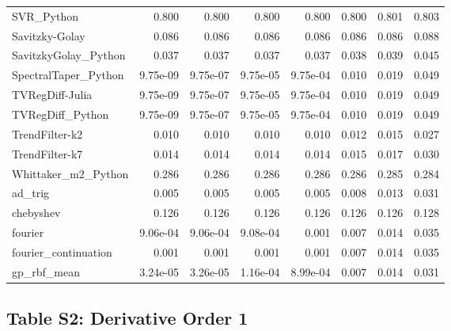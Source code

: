 \documentclass[10pt]{article}
\begin{document}
\begin{longtable}{lrrrrrrr}
SVR\_Python & 0.800 & 0.800 & 0.800 & 0.800 & 0.800 & 0.801 & 0.803 \\
Savitzky-Golay & 0.086 & 0.086 & 0.086 & 0.086 & 0.086 & 0.086 & 0.088 \\
SavitzkyGolay\_Python & 0.037 & 0.037 & 0.037 & 0.037 & 0.038 & 0.039 & 0.045 \\
SpectralTaper\_Python & 9.75e-09 & 9.75e-07 & 9.75e-05 & 9.75e-04 & 0.010 & 0.019 & 0.049 \\
TVRegDiff-Julia & 9.75e-09 & 9.75e-07 & 9.75e-05 & 9.75e-04 & 0.010 & 0.019 & 0.049 \\
TVRegDiff\_Python & 9.75e-09 & 9.75e-07 & 9.75e-05 & 9.75e-04 & 0.010 & 0.019 & 0.049 \\
TrendFilter-k2 & 0.010 & 0.010 & 0.010 & 0.010 & 0.012 & 0.015 & 0.027 \\
TrendFilter-k7 & 0.014 & 0.014 & 0.014 & 0.014 & 0.015 & 0.017 & 0.030 \\
Whittaker\_m2\_Python & 0.286 & 0.286 & 0.286 & 0.286 & 0.286 & 0.285 & 0.284 \\
ad\_trig & 0.005 & 0.005 & 0.005 & 0.005 & 0.008 & 0.013 & 0.031 \\
chebyshev & 0.126 & 0.126 & 0.126 & 0.126 & 0.126 & 0.126 & 0.128 \\
fourier & 9.06e-04 & 9.06e-04 & 9.08e-04 & 0.001 & 0.007 & 0.014 & 0.035 \\
fourier\_continuation & 0.001 & 0.001 & 0.001 & 0.001 & 0.007 & 0.014 & 0.035 \\
gp\_rbf\_mean & 3.24e-05 & 3.26e-05 & 1.16e-04 & 8.99e-04 & 0.007 & 0.014 & 0.031 \\
\bottomrule
\end{longtable}

\clearpage

\subsection*{Table S2: Derivative Order 1}
\end{document}
